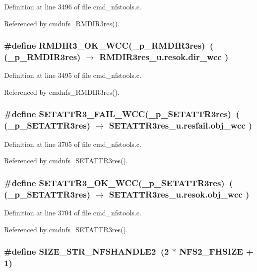 Definition at line 3496 of file cmd\_\-nfstools.c.

Referenced by cmdnfs\_\-RMDIR3res().
\subsubsection{\setlength{\rightskip}{0pt plus 5cm}\#define RMDIR3\_\-OK\_\-WCC(\_\-p\_\-RMDIR3res)\ ( (\_\-p\_\-RMDIR3res) $\rightarrow$ RMDIR3res\_\-u.resok.dir\_\-wcc )}\label{cmd__nfstools_8c_a35}




Definition at line 3495 of file cmd\_\-nfstools.c.

Referenced by cmdnfs\_\-RMDIR3res().
\subsubsection{\setlength{\rightskip}{0pt plus 5cm}\#define SETATTR3\_\-FAIL\_\-WCC(\_\-p\_\-SETATTR3res)\ ( (\_\-p\_\-SETATTR3res) $\rightarrow$ SETATTR3res\_\-u.resfail.obj\_\-wcc )}\label{cmd__nfstools_8c_a38}




Definition at line 3705 of file cmd\_\-nfstools.c.

Referenced by cmdnfs\_\-SETATTR3res().
\subsubsection{\setlength{\rightskip}{0pt plus 5cm}\#define SETATTR3\_\-OK\_\-WCC(\_\-p\_\-SETATTR3res)\ ( (\_\-p\_\-SETATTR3res) $\rightarrow$ SETATTR3res\_\-u.resok.obj\_\-wcc )}\label{cmd__nfstools_8c_a37}




Definition at line 3704 of file cmd\_\-nfstools.c.

Referenced by cmdnfs\_\-SETATTR3res().
\subsubsection{\setlength{\rightskip}{0pt plus 5cm}\#define SIZE\_\-STR\_\-NFSHANDLE2\ (2 $\ast$ NFS2\_\-FHSIZE + 1)}\label{cmd__nfstools_8c_a0}





